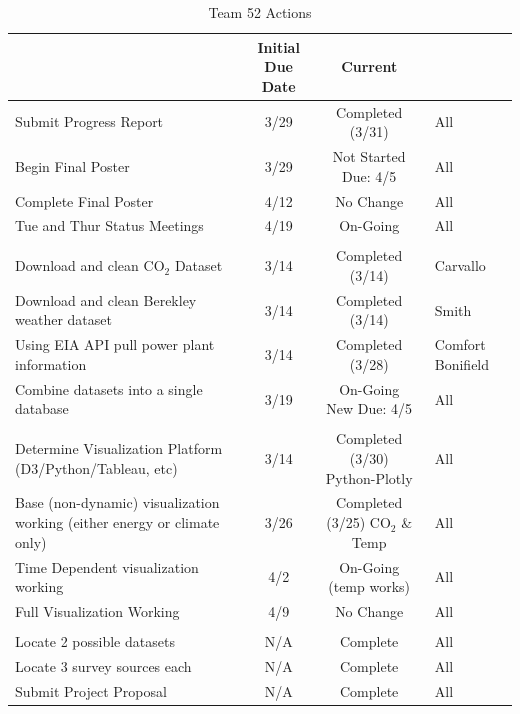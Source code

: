 \documentclass[sigconf,nonacm=true]{acmart}
\begin{document}
\begin{table}[H] 
	\caption{Team 52 Actions}\label{table:actions}
\begin{tabular}{| p{1.25in} | c | c | >{\centering\arraybackslash}m{0.5in} |}

	\hline 
	\rowcolor{Gray}
	\makecell{\textbf{Task}} & \makecell{\textbf{Initial} \\ \textbf{Due Date}} & \textbf{Current} & \makecell{\textbf{Owner}} \\ 
	\hline 
	Submit Progress Report & 3/29 & \makecell{Completed\\ (3/31)} & All \\
	\hline
	Begin Final Poster & 3/29 & \makecell{Not Started\\Due: 4/5}  &All \\
	\hline
	Complete Final Poster & 4/12 & No Change &All \\
	\hline
	Tue and Thur Status Meetings & 4/19 & On-Going & All\\
	\hline
	\rowcolor{Gray}
	\multicolumn{4}{|l|}{\textbf{The Data}} \\
	\hline
	Download and clean CO$_2$ Dataset & 3/14 & \makecell{Completed \\ (3/14)} &Carvallo  \\ 
	\hline
	Download and clean Berekley weather dataset & 3/14& \makecell{Completed \\ (3/14)} & Smith \\
	\hline
	Using EIA API pull power plant information & 3/14 & \makecell{Completed \\ (3/28)} & Comfort Bonifield \\
	\hline
	Combine datasets into a single database & 3/19 & \makecell{On-Going \\ New Due: 4/5} &All \\
	\hline
	\rowcolor{Gray}
	\multicolumn{4}{|l|}{\textbf{Visualizations}} \\
	\hline
	Determine Visualization Platform (D3/Python/Tableau, etc) & 3/14 & \makecell{Completed \\ (3/30)\\ Python-Plotly} & All \\	
	\hline
	Base (non-dynamic) visualization working (either energy or climate only) & 3/26 & \makecell{Completed \\(3/25) \\ CO$_2$ \& Temp}& All \\
	\hline 
	Time Dependent visualization working & 4/2 & \makecell{On-Going \\ (temp works)}& All \\
	\hline
	Full Visualization Working & 4/9 & No Change &All \\
	\hline
	\rowcolor{Gray}
	\multicolumn{4}{|l|}{\textbf{Milestones}} \\
	\hline
	Locate 2 possible datasets & N/A & Complete & All\\
	\hline
	Locate 3 survey sources each & N/A & Complete & All \\
	\hline
	Submit Project Proposal & N/A & Complete & All\\
	\hline
\end{tabular} 
\end{table}
\end{document}
